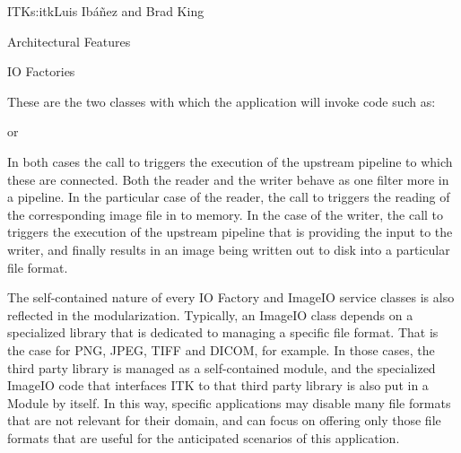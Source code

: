 \begin{aosachapter}{ITK}{s:itk}{Luis Ib\'{a}\~{n}ez and Brad King}
\begin{aosasect1}{Architectural Features}
\begin{aosasect2}{IO Factories}
\begin{aosaitemize}
\item {}
\item {}
\end{aosaitemize}

These are the two classes with which the application will invoke code such as:

\begin{aosaitemize}
\item {}
\item {}
\end{aosaitemize}

or

\begin{aosaitemize}
\item {}
\item {}
\end{aosaitemize}

In both cases the call to  triggers the execution of the
upstream pipeline to which these  are connected. Both the
reader and the writer behave as one filter more in a pipeline. In the
particular case of the reader, the call to  triggers the reading
of the corresponding image file in to memory. In the case of the writer, the
call to  triggers the execution of the upstream pipeline that is
providing the input to the writer, and finally results in an image being
written out to disk into a particular file format.

The self-contained nature of every IO Factory and ImageIO service classes is
also reflected in the modularization. Typically, an ImageIO class depends on a
specialized library that is dedicated to managing a specific file format. That
is the case for PNG, JPEG, TIFF and DICOM, for example. In those cases, the
third party library is managed as a self-contained module, and the specialized
ImageIO code that interfaces ITK to that third party library is also put in a
Module by itself. In this way, specific applications may disable many
file formats that are not relevant for their domain, and can focus on offering
only those file formats that are useful for the anticipated scenarios of this
application.


\end{aosasect2}
\end{aosasect1}
\end{aosachapter}
